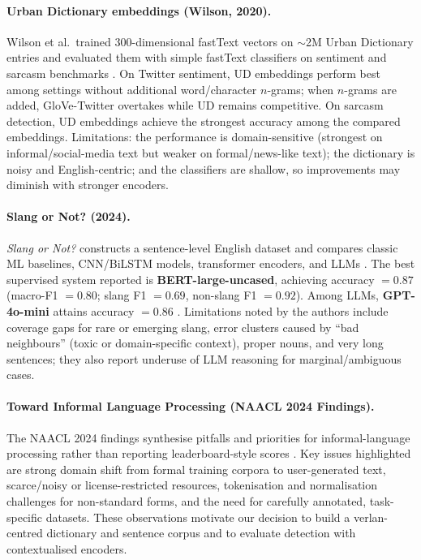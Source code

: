 \documentclass[12pt]{article}
\begin{document}
\paragraph{Urban Dictionary embeddings (Wilson, 2020).}
Wilson et al.\ trained $300$-dimensional fastText vectors on $\sim$2M Urban Dictionary entries and evaluated them with simple fastText classifiers on sentiment and sarcasm benchmarks \cite{urban2020embeddings}. On Twitter sentiment, UD embeddings perform best among settings without additional word/character $n$-grams; when $n$-grams are added, GloVe-Twitter overtakes while UD remains competitive. On sarcasm detection, UD embeddings achieve the strongest accuracy among the compared embeddings. Limitations: the performance is domain-sensitive (strongest on informal/social-media text but weaker on formal/news-like text); the dictionary is noisy and English-centric; and the classifiers are shallow, so improvements may diminish with stronger encoders. \cite{urban2020embeddings}

\paragraph{Slang or Not? (2024).}
\textit{Slang or Not?} constructs a sentence-level English dataset and compares classic ML baselines, CNN/BiLSTM models, transformer encoders, and LLMs \cite{slangornot2024}. The best supervised system reported is \textbf{BERT-large-uncased}, achieving accuracy $=0.87$ (macro-F1 $=0.80$; slang F1 $=0.69$, non-slang F1 $=0.92$). Among LLMs, \textbf{GPT-4o-mini} attains accuracy $=0.86$ \cite{slangornot2024}. Limitations noted by the authors include coverage gaps for rare or emerging slang, error clusters caused by “bad neighbours” (toxic or domain-specific context), proper nouns, and very long sentences; they also report underuse of LLM reasoning for marginal/ambiguous cases. \cite{slangornot2024}

\paragraph{Toward Informal Language Processing (NAACL 2024 Findings).}
The NAACL 2024 findings synthesise pitfalls and priorities for informal-language processing rather than reporting leaderboard-style scores \cite{sun2024informal}. Key issues highlighted are strong domain shift from formal training corpora to user-generated text, scarce/noisy or license-restricted resources, tokenisation and normalisation challenges for non-standard forms, and the need for carefully annotated, task-specific datasets. These observations motivate our decision to build a verlan-centred dictionary and sentence corpus and to evaluate detection with contextualised encoders. \cite{sun2024informal}
\end{document}
